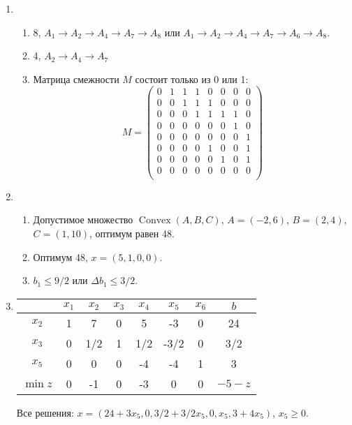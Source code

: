 \documentclass[12pt]{article}
\DeclareMathOperator{\Convex}{Convex}
\begin{document}
\begin{enumerate}
\begin{enumerate}
\end{enumerate}
  \item 
\begin{enumerate}
  \item 8, $A_1 \to A_2 \to A_4 \to A_7 \to A_8$ или $A_1 \to A_2 \to A_4 \to A_7 \to A_6 \to A_8$.
  \item 4, $A_2 \to A_4 \to A_7$
  \item Матрица смежности $M$ состоит только из 0 или 1:
  \[
  M = \begin{pmatrix}
    0 & 1 & 1 & 1 & 0 & 0 & 0 & 0 \\
    0 & 0 & 1 & 1 & 1 & 0 & 0 & 0 \\
    0 & 0 & 0 & 1 & 1 & 1 & 1 & 0 \\
    0 & 0 & 0 & 0 & 0 & 0 & 1 & 0 \\
    0 & 0 & 0 & 0 & 0 & 0 & 0 & 1 \\
    0 & 0 & 0 & 0 & 1 & 0 & 0 & 1 \\
    0 & 0 & 0 & 0 & 0 & 1 & 0 & 1 \\
    0 & 0 & 0 & 0 & 0 & 0 & 0 & 0 \\
  \end{pmatrix}
  \]
\end{enumerate}
\item 
\begin{enumerate}
  \item Допустимое множество $\Convex(A, B, C)$, $A = (-2, 6)$, $B = (2, 4)$, $C = (1, 10)$, оптимум равен 48.
  \item Оптимум 48, $x = (5, 1, 0, 0)$.
  \item $b_1 \leq 9/2$ или $\Delta b_1 \leq 3/2$.
\end{enumerate}
\item 

\begin{tabular}{ccccccc|c}
  \toprule
    & $x_1$ & $x_2$ & $x_3$ & $x_4$ & $x_5$ & $x_6$ & $b$  \\ \midrule
$x_2$ & 1 & 7 & 0 & 5 & -3 & 0 & 24  \\
$x_3$ & 0 & 1/2 & 1 & 1/2 & -3/2 & 0 & 3/2  \\
$x_5$ & 0 & 0 & 0 & -4 & -4 & 1 & 3  \\ \midrule
$\min z$ & 0 & -1 & 0 & -3 & 0 & 0 & $-5 - z$  \\ \bottomrule
\end{tabular}

Все решения: $x = (24 + 3x_5, 0, 3/2 + 3/2x_5, 0, x_5, 3 + 4x_5)$, $x_5 \geq 0$. 


\end{enumerate}
\end{document}
